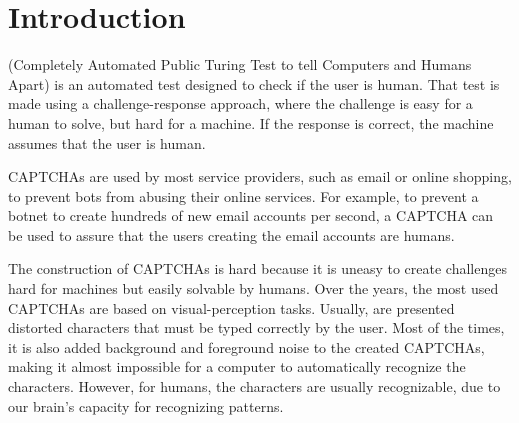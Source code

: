\documentclass[journal]{IEEEtran}
\begin{document}

%
\IEEEpeerreviewmaketitle

\section{Introduction}

 (Completely Automated Public Turing Test to tell Computers and Humans Apart) is an automated test designed to check if the user is human. That test is made using a challenge-response approach, where the challenge is easy for a human to solve, but hard for a machine. If the response is correct, the machine assumes that the user is human.

CAPTCHAs are used by most service providers, such as email or online shopping, to prevent bots from abusing their online services. For example, to prevent a botnet to create hundreds of new email accounts per second, a CAPTCHA can be used to assure that the users creating the email accounts are humans.

The construction of CAPTCHAs is hard because it is uneasy to create challenges hard for machines but easily solvable by humans. Over the years, the most used CAPTCHAs are based on visual-perception tasks. Usually, are presented distorted characters that must be typed correctly by the user. Most of the times, it is also added background and foreground noise to the created CAPTCHAs, making it almost impossible for a computer to automatically recognize the characters. However, for humans, the characters are usually recognizable, due to our brain's capacity for recognizing patterns.
\end{document}
